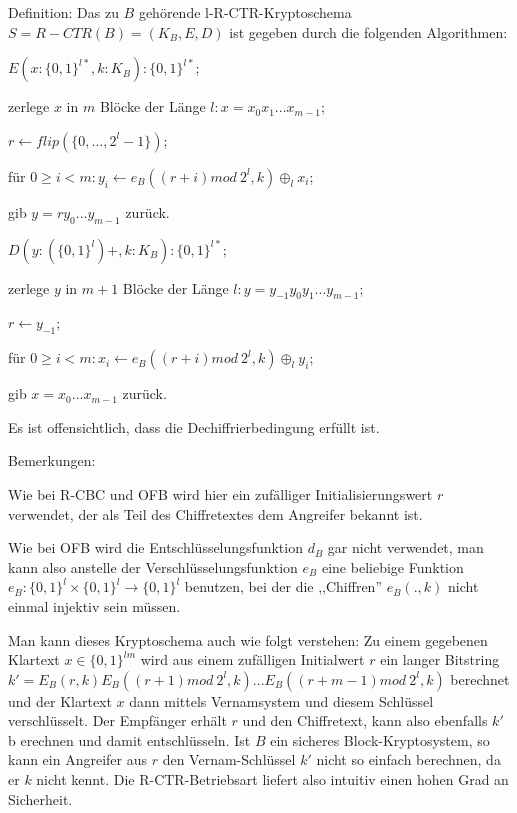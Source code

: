 \documentclass[a4paper]{article}
\begin{document}
\begin{multicols}{3}
    Definition: Das zu $B$ gehörende l-R-CTR-Kryptoschema $S=R-CTR(B) = (K_B,E,D)$ ist gegeben durch die folgenden Algorithmen:
    \begin{itemize*}
        \item $E(x:\{0,1\}^{l*},k:K_B) :\{0,1\}^{l*}$;
        \item zerlege $x$ in $m$ Blöcke der Länge $l:x=x_0 x_1 ...x_{m-1}$;
        \item $r\leftarrow flip(\{0,..., 2^l-1\})$;
        \item für $0\geq i < m:y_i\leftarrow e_B((r+i) mod\ 2^l,k)\oplus_l x_i$;
        \item gib $y=r y_0 ...y_{m-1}$ zurück.
        \item $D(y: (\{0,1\}^l)+,k:K_B) :\{0,1\}^{l*}$;
        \item zerlege $y$ in $m+1$ Blöcke der Länge $l:y=y_{-1} y_0 y_1 ...y_{m-1}$;
        \item $r\leftarrow y_{-1}$;
        \item für $0\geq i < m:x_i\leftarrow e_B((r+i) mod\ 2^l,k)\oplus_l y_i$;
        \item gib $x=x_0 ...x_{m-1}$ zurück.
    \end{itemize*}

    Es ist offensichtlich, dass die Dechiffrierbedingung erfüllt ist.

    Bemerkungen:
    \begin{itemize*}
        \item Wie bei R-CBC und OFB wird hier ein zufälliger Initialisierungswert $r$ verwendet, der als Teil des Chiffretextes dem Angreifer bekannt ist.
        \item Wie bei OFB wird die Entschlüsselungsfunktion $d_B$ gar nicht verwendet, man kann also anstelle der Verschlüsselungsfunktion $e_B$ eine beliebige Funktion $e_B:\{0,1\}^l\times\{0,1\}^l\rightarrow\{0,1\}^l$ benutzen, bei der die ,,Chiffren'' $e_B(.,k)$ nicht einmal injektiv sein müssen.
        \item Man kann dieses Kryptoschema auch wie folgt verstehen: Zu einem gegebenen Klartext $x\in\{0,1\}^{lm}$ wird aus einem zufälligen Initialwert $r$ ein langer Bitstring $k'=E_B(r,k) E_B((r+1) mod\ 2^l,k)... E_B((r+m-1) mod\ 2^l,k)$ berechnet und der Klartext $x$ dann mittels Vernamsystem und diesem Schlüssel verschlüsselt. Der Empfänger erhält $r$ und den Chiffretext, kann also ebenfalls $k'$ b erechnen und damit entschlüsseln. Ist $B$ ein sicheres Block-Kryptosystem, so kann ein Angreifer aus $r$ den Vernam-Schlüssel $k'$ nicht so einfach berechnen, da er $k$ nicht kennt. Die R-CTR-Betriebsart liefert also intuitiv einen hohen Grad an Sicherheit.
    \end{itemize*}


\end{multicols}
\end{document}

